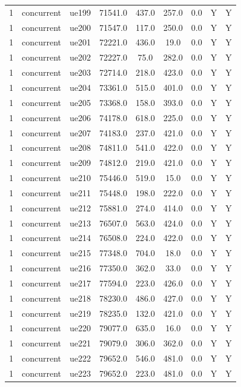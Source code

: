 \begin{table}[ht]
\begin{tabular}{|c|c|c|c|c|c|c|c|c|}
1 & concurrent & ue199 & 71541.0 & 437.0 & 257.0 & 0.0 & Y & Y \\
1 & concurrent & ue200 & 71547.0 & 117.0 & 250.0 & 0.0 & Y & Y \\
1 & concurrent & ue201 & 72221.0 & 436.0 & 19.0 & 0.0 & Y & Y \\
1 & concurrent & ue202 & 72227.0 & 75.0 & 282.0 & 0.0 & Y & Y \\
1 & concurrent & ue203 & 72714.0 & 218.0 & 423.0 & 0.0 & Y & Y \\
1 & concurrent & ue204 & 73361.0 & 515.0 & 401.0 & 0.0 & Y & Y \\
1 & concurrent & ue205 & 73368.0 & 158.0 & 393.0 & 0.0 & Y & Y \\
1 & concurrent & ue206 & 74178.0 & 618.0 & 225.0 & 0.0 & Y & Y \\
1 & concurrent & ue207 & 74183.0 & 237.0 & 421.0 & 0.0 & Y & Y \\
1 & concurrent & ue208 & 74811.0 & 541.0 & 422.0 & 0.0 & Y & Y \\
1 & concurrent & ue209 & 74812.0 & 219.0 & 421.0 & 0.0 & Y & Y \\
1 & concurrent & ue210 & 75446.0 & 519.0 & 15.0 & 0.0 & Y & Y \\
1 & concurrent & ue211 & 75448.0 & 198.0 & 222.0 & 0.0 & Y & Y \\
1 & concurrent & ue212 & 75881.0 & 274.0 & 414.0 & 0.0 & Y & Y \\
1 & concurrent & ue213 & 76507.0 & 563.0 & 424.0 & 0.0 & Y & Y \\
1 & concurrent & ue214 & 76508.0 & 224.0 & 422.0 & 0.0 & Y & Y \\
1 & concurrent & ue215 & 77348.0 & 704.0 & 18.0 & 0.0 & Y & Y \\
1 & concurrent & ue216 & 77350.0 & 362.0 & 33.0 & 0.0 & Y & Y \\
1 & concurrent & ue217 & 77594.0 & 223.0 & 426.0 & 0.0 & Y & Y \\
1 & concurrent & ue218 & 78230.0 & 486.0 & 427.0 & 0.0 & Y & Y \\
1 & concurrent & ue219 & 78235.0 & 132.0 & 421.0 & 0.0 & Y & Y \\
1 & concurrent & ue220 & 79077.0 & 635.0 & 16.0 & 0.0 & Y & Y \\
1 & concurrent & ue221 & 79079.0 & 306.0 & 362.0 & 0.0 & Y & Y \\
1 & concurrent & ue222 & 79652.0 & 546.0 & 481.0 & 0.0 & Y & Y \\
1 & concurrent & ue223 & 79652.0 & 223.0 & 481.0 & 0.0 & Y & Y \\

\end{tabular}
\end{table}

